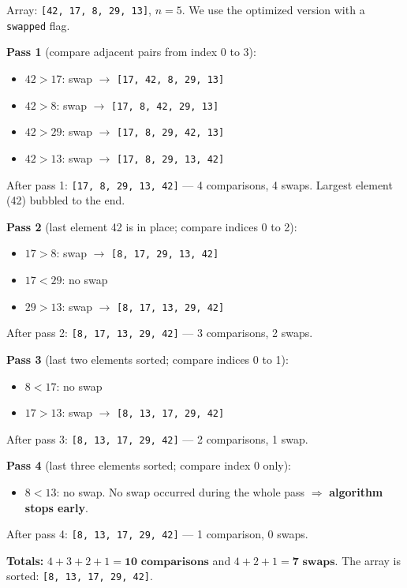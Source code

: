 \documentclass[11pt]{article}
\begin{document}
\begin{corrige}
Array: \texttt{[42, 17, 8, 29, 13]}, $n = 5$. We use the optimized version with a \texttt{swapped} flag.

\textbf{Pass 1} (compare adjacent pairs from index 0 to 3):
\begin{itemize}
\item $42 > 17$: swap $\to$ \texttt{[17, 42, 8, 29, 13]}
\item $42 > 8$: swap $\to$ \texttt{[17, 8, 42, 29, 13]}
\item $42 > 29$: swap $\to$ \texttt{[17, 8, 29, 42, 13]}
\item $42 > 13$: swap $\to$ \texttt{[17, 8, 29, 13, 42]}
\end{itemize}
After pass 1: \texttt{[17, 8, 29, 13, 42]} --- 4 comparisons, 4 swaps. Largest element (42) bubbled to the end.

\textbf{Pass 2} (last element 42 is in place; compare indices 0 to 2):
\begin{itemize}
\item $17 > 8$: swap $\to$ \texttt{[8, 17, 29, 13, 42]}
\item $17 < 29$: no swap
\item $29 > 13$: swap $\to$ \texttt{[8, 17, 13, 29, 42]}
\end{itemize}
After pass 2: \texttt{[8, 17, 13, 29, 42]} --- 3 comparisons, 2 swaps.

\textbf{Pass 3} (last two elements sorted; compare indices 0 to 1):
\begin{itemize}
\item $8 < 17$: no swap
\item $17 > 13$: swap $\to$ \texttt{[8, 13, 17, 29, 42]}
\end{itemize}
After pass 3: \texttt{[8, 13, 17, 29, 42]} --- 2 comparisons, 1 swap.

\textbf{Pass 4} (last three elements sorted; compare index 0 only):
\begin{itemize}
\item $8 < 13$: no swap. No swap occurred during the whole pass $\Rightarrow$ \textbf{algorithm stops early}.
\end{itemize}
After pass 4: \texttt{[8, 13, 17, 29, 42]} --- 1 comparison, 0 swaps.

\textbf{Totals:} $4 + 3 + 2 + 1 = \textbf{10 comparisons}$ and $4 + 2 + 1 = \textbf{7 swaps}$. The array is sorted: \texttt{[8, 13, 17, 29, 42]}.
\end{corrige}
\end{document}
